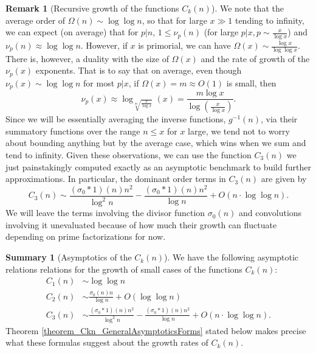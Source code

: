 \documentclass[11pt,reqno,a4letter]{article}
\numberwithin{figure}{section}
\numberwithin{table}{section}
\theoremstyle{plain}
\numberwithin{theorem}{section}
\theoremstyle{definition}
\newtheorem{remark}[theorem]{Remark}
\newtheorem{summary}[theorem]{Summary}
\begin{document}
\begin{remark}[Recursive growth of the functions $C_k(n)$]
We note that the average order of $\Omega(n) \sim \log\log n$, so that for large $x \gg 1$ tending to 
infinity, we can expect (on average) that for $p|n$, $1 \leq \nu_p(n)$ (for large $p|x, p \sim \frac{x}{\log x}$) 
and $\nu_p(n) \approx \log\log n$. However, if $x$ is primorial, we can have 
$\Omega(x) \sim \frac{\log x}{\log\log x}$. There is, however, a duality with the size of $\Omega(x)$ and the 
rate of growth of the $\nu_p(x)$ exponents. That is to say that on average, 
even though $\nu_p(x) \sim \log\log n$ for most $p|x$, if $\Omega(x) = m \approx O(1)$ is small, then 
\[
\nu_p(x) \approx \log_{\sqrt[m]{\frac{x}{\log x}}}(x) = \frac{m \log x}{\log\left(\frac{x}{\log x}\right)}. 
\]
Since we will be essentially averaging the inverse functions, $g^{-1}(n)$, via their summatory functions 
over the range $n \leq x$ for $x$ large, we tend not to worry about bounding anything but by the 
average case, which wins when we sum and tend to infinity. 
Given these observations, we can use the function $C_3(n)$ we just painstakingly computed exactly 
as an asymptotic benchmark to build further approximations. In particular, the dominant order terms in 
$C_3(n)$ are given by 
\[
C_3(n) \sim \frac{(\sigma_0 \ast 1)(n) n^2}{\log^2 n} - 
     \frac{(\sigma_0 \ast 1)(n) n^2}{\log n} + 
     O\left(n \cdot \log\log n\right). 
\]
We will leave the terms involving the divisor function $\sigma_0(n)$ and convolutions 
involving it unevaluated because of how much their growth can fluctuate depending on prime 
factorizations for now. 
\end{remark} 

\begin{summary}[Asymptotics of the $C_k(n)$]
We have the following asymptotic relations relations for the growth of small cases of 
the functions $C_k(n)$: 
\begin{align*} 
C_1(n) & \sim \log\log n \\ 
C_2(n) & \sim \frac{\sigma_0(n) n}{\log n} + O(\log\log n) \\ 
C_3(n) & \sim \frac{(\sigma_0 \ast 1)(n) n^2}{\log^2 n} - 
     \frac{(\sigma_0 \ast 1)(n) n^2}{\log n} + 
     O\left(n \cdot \log\log n\right). 
\end{align*} 
Theorem \ref{theorem_Ckn_GeneralAsymptoticsForms} stated below 
makes precise what these formulas suggest about the growth rates of 
$C_k(n)$. 
\end{summary} 
\end{document}
